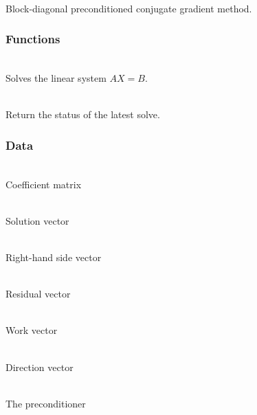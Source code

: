 \documentclass[11pt]{article}
\begin{document}
     \\
     Block-diagonal preconditioned conjugate gradient method.

\subsubsection{ Functions}

   \umlSolver

     \\ Solves the linear system $A X = B$.

     \\
    Return the status of the latest solve.

\subsubsection{ Data}

     \\
    Coefficient matrix

     \\
    Solution vector

     \\
    Right-hand side vector

     \\
    Residual vector

     \\
    Work vector

     \\
    Direction vector

     \\
    The preconditioner
\end{document}

